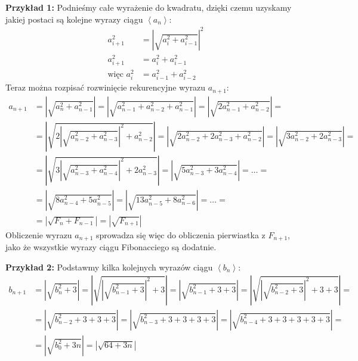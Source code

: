 \documentclass[a4paper,12pt]{article}
\newcommand{\abs}[1]{\left| #1 \right|}					%
\newcommand{\sequence}[1]{\left\langle #1 \right\rangle} %
\begin{document}
\noindent \newline \textbf{Przykład 1:}
Podnieśmy całe wyrażenie do kwadratu, dzięki czemu uzyskamy jakiej postaci są kolejne wyrazy ciągu $\sequence{a_n}$:
\begin{align*}
	a_{i+1}^2 &= \abs{\sqrt{a_i^2 + a_{i-1}^2}}^2 \\
	a_{i+1}^2 &= a_i^2 + a_{i-1}^2 \\
	\text{więc } a_i^2 &= a_{i-1}^2 + a_{i-2}^2
\end{align*}
Teraz można rozpisać rozwinięcie rekurencyjne wyrazu $a_{n+1}$:
\begin{align*}
	a_{n+1}	&= \abs{\sqrt{a_n^2 + a_{n-1}^2}} = \abs{\sqrt{a_{n-1}^2 + a_{n-2}^2 + a_{n-1}^2}} = \abs{\sqrt{2 a_{n-1}^2 + a_{n-2}^2}} =\\
			&= \abs{\sqrt{2\abs{\sqrt{a_{n-2}^2 + a_{n-3}^2}}^2 + a_{n-2}^2}} = \abs{\sqrt{2 a_{n-2}^2 + 2 a_{n-3}^2 + a_{n-2}^2}} = \abs{\sqrt{3 a_{n-2}^2 + 2 a_{n-3}^2}} = \\
			&= \abs{\sqrt{3\abs{\sqrt{a_{n-3}^2 + a_{n-4}^2}}^2 + 2 a_{n-3}^2}} = \abs{\sqrt{5 a_{n-3}^2 + 3 a_{n-4}^2}} = \ldots = \\
			&= \abs{\sqrt{8 a_{n-4}^2 + 5 a_{n-5}^2}} = \abs{\sqrt{13 a_{n-5}^2 + 8 a_{n-6}^2}} = \ldots = \\
			&= \abs{\sqrt{ F_n + F_{n-1} }} = \abs{\sqrt{ F_{n+1} }}
\end{align*}
Obliczenie wyrazu $a_{n+1}$ sprowadza się więc do obliczenia pierwiastka z $F_{n+1}$, jako że wszystkie wyrazy ciągu Fibonacciego są dodatnie.

\noindent \newline \textbf{Przykład 2:} Podstawmy kilka kolejnych wyrazów ciągu $\sequence{b_n}$:
\begin{align*}
	b_{n+1} &= \abs{\sqrt{b_n^2 + 3}} = \abs{\sqrt{\abs{\sqrt{b_{n-1}^2 + 3}}^2 + 3}} = \abs{\sqrt{b_{n-1}^2 + 3 + 3}} = \abs{\sqrt{\abs{\sqrt{b_{n-2}^2 + 3}}^2 + 3 + 3}} = \\
	&= \abs{\sqrt{b_{n-2}^2 + 3 + 3 + 3}} = \abs{\sqrt{b_{n-3}^2 + 3 + 3 + 3 + 3}} = \abs{\sqrt{b_{n-4}^2 + 3 + 3 + 3 + 3 + 3}} = \\
	&= \abs{\sqrt{ b_0^2 + 3n }} = \abs{\sqrt{ 64 + 3n }}
\end{align*}
\end{document}
